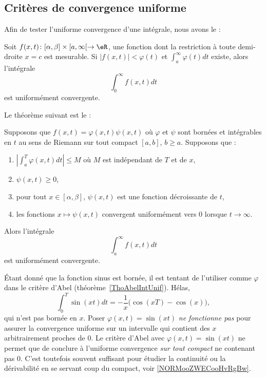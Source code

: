 \subsection{Critères de convergence uniforme}

Afin de tester l'uniforme convergence d'une intégrale, nous avons le :
\begin{theorem}     \label{ThoCritWeiIntUnifCv}
	Soit \( f(x,t)\colon [\alpha,\beta]\times[a,\infty[ \to \eR\), une fonction dont la restriction à toute demi-droite \( x=c\) est mesurable. Si \( | f(x,t) |< \varphi(t)\) et \( \int_a^{\infty}\varphi(t)dt\) existe, alors l'intégrale
	\begin{equation}
		\int_0^{\infty}f(x,t)dt
	\end{equation}
	est uniformément convergente.
\end{theorem}

Le théorème suivant est le  :
\begin{theorem}     \label{ThoAbelIntUnif}
	Supposons que \( f(x,t)=\varphi(x,t)\psi(x,t)\) où \( \varphi\) et \( \psi\) sont bornées et intégrables en \( t\) au sens de Riemann sur tout compact \( [a,b]\), \( b\geq a\). Supposons que :
	\begin{enumerate}
		\item \( \left| \int_a^{T}\varphi(x,t)dt \right| \leq M\) où \( M\) est indépendant de \( T\) et de \( x\),
		\item \( \psi(x,t)\geq 0\),
		\item pour tout \( x\in[\alpha,\beta]\), \( \psi(x,t)\) est une fonction décroissante de \( t\),
		\item les fonctions \( x\mapsto \psi(x,t)\) convergent uniformément vers \( 0\) lorsque \( t\to\infty\).
	\end{enumerate}
	Alors l'intégrale
	\begin{equation}
		\int_a^{\infty}f(x,t)dt
	\end{equation}
	est uniformément convergente.
\end{theorem}

\begin{remark}
	Étant donné que la fonction sinus est bornée, il est tentant de l'utiliser comme \( \varphi\) dans le critère d'Abel (théorème~\ref{ThoAbelIntUnif}). Hélas,
	\begin{equation}
		\int_0^T\sin(xt)dt=-\frac{ 1 }{ x }\big( \cos(xT)-\cos(x) \big),
	\end{equation}
	qui n'est pas bornée en \( x\). Poser \( \varphi(x,t)=\sin(xt)\) \emph{ne fonctionne pas} pour assurer la convergence uniforme sur un intervalle qui contient des \( x\) arbitrairement proches de \( 0\). Le critère d'Abel avec \( \varphi(x,t)=\sin(xt)\) ne permet que de conclure à l'uniforme convergence \emph{sur tout compact} ne contenant pas \( 0\). C'est toutefois souvent suffisant pour étudier la continuité ou la dérivabilité en se servant coup du compact, voir \ref{NORMooZWECooHvRgBw}.
\end{remark}

